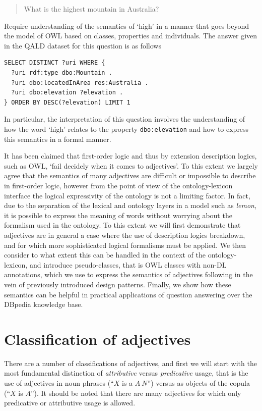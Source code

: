 \documentclass[11pt]{article}
\begin{document}
\begin{quote}
What is the highest mountain in Australia?
\end{quote}

Require understanding of the semantics of `high' in a manner that goes beyond the model of OWL based on classes, properties and individuals. The answer given in the QALD dataset for this question is as follows

\begin{verbatim}
SELECT DISTINCT ?uri WHERE { 
  ?uri rdf:type dbo:Mountain . 
  ?uri dbo:locatedInArea res:Australia . 
  ?uri dbo:elevation ?elevation . 
} ORDER BY DESC(?elevation) LIMIT 1
\end{verbatim}

In particular, the interpretation of this question involves the understanding of how the word `high' relates to the property {\tt dbo:elevation} and how to express this semantics in a formal manner.

It has been claimed that first-order logic and thus by extension description logics, such as OWL, `fail decidely when it comes to adjectives'\cite{bankston2003modeling}. To this extent we largely agree that the semantics of many adjectives are difficult or impossible to describe in first-order logic, however from the point of view of the ontology-lexicon interface the logical expressivity of the ontology is not a limiting factor. In fact, due to the separation of the lexical and ontology layers in a model such as \emph{lemon}, it is possible to express the meaning of words without worrying about the formalism used in the ontology. To this extent we will first demonstrate that adjectives are in general a case where the use of description logics breakdown, and for which more sophisticated logical formalisms must be applied. We then consider to what extent this can be handled in the context of the ontology-lexicon, and introduce pseudo-classes, that is OWL classes with non-DL annotations, which we use to express the semantics of adjectives following in the vein of previously introduced design patterns\cite{mccrae2014design}. Finally, we show how these semantics can be helpful in practical applications of question answering over the DBpedia knowledge base.

\section{Classification of adjectives}

There are a number of classifications of adjectives, and first we will start with the most fundamental distinction of \emph{attributive} versus \emph{predicative} usage, that is the use of adjectives in noun phrases (``$X$ is a $A~N$'') versus as objects of the copula (``$X$ is $A$''). It should be noted that there are many adjectives for which only predicative or attributive usage is allowed.
\end{document}

